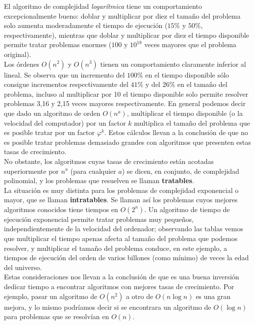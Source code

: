 El algoritmo de complejidad \emph{logarítmica} tiene un comportamiento excepcionalmente bueno: doblar y multiplicar por diez el tamaño del problema solo aumenta moderadamente el tiempo de ejecución ($15\%$ y $50\%$, respectivamente), mientras que doblar y multiplicar por diez el tiempo disponible permite tratar problemas enormes ($100$ y $10^{18}$ veces mayores que el problema original).\\

Los órdenes $O(n^2)$ y $O(n^3)$ tienen un comportamiento claramente inferior al lineal. Se observa que un incremento del $100\%$ en el tiempo disponible sólo consigue incrementos respectivamente del $41\%$ y del $26\%$ en el tamaño del problema, incluso al multiplicar por 10 el tiempo disponible solo permite resolver problemas 3,16 y 2,15 veces mayores respectivamente. En general podemos decir que dado un algoritmo de orden $O(n^a)$, multiplicar el tiempo disponible (o la velocidad del computador) por un factor $k$ multiplica el tamaño del problema que es posible tratar por un factor $\varphi^k$. Estos cálculos llevan a la conclusión de que no es posible tratar problemas demasiado grandes con algoritmos que presenten estas tasas de crecimiento.\\

No obstante, los algoritmos cuyas tasas de crecimiento están acotadas superiormente por $n^a$ (para cualquier $a$) se dicen, en conjunto, de complejidad polinomial, y los problemas que resuelven se llaman \textbf{tratables}.\\

La situación es muy distinta para los problemas de complejidad exponencial o mayor, que se llaman \textbf{intratables}. Se llaman así los problemas cuyos mejores algoritmos conocidos tiene tiempos en $O(2^n)$. Un algoritmo de tiempo de ejecución exponencial permite tratar problemas muy pequeños, independientemente de la velocidad del ordenador; observando las tablas vemos que multiplicar el tiempo apenas afecta al tamaño del problema que podemos resolver, y multiplicar el tamaño del problema conduce, en este ejemplo, a tiempos de ejecución del orden de varios billones (como mínimo) de veces la edad del universo.\\

Estas consideraciones nos llevan a la conclusión de que es una buena inversión dedicar tiempo a encontrar algoritmos con mejores tasas de crecimiento. Por ejemplo, pasar un algoritmo de $O(n^2)$ a otro de $O(n \log n)$ es una gran mejora, y lo mismo podríamos decir si se encontrara un algoritmo de $O(\log n)$ para problemas que se resolvían en $O(n)$.\\

